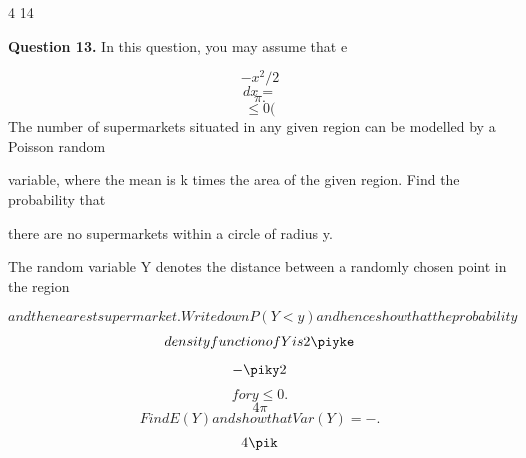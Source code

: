 \documentclass[12pt]{article}
\begin{document}
\begin{flushleft}
4 14\par
\infty\par
\bigskip\textbf{Question 13.} In this question, you may assume that e\par
\[-x^2/2\]
\[dx =\]
\[\pi .\]
\[\leq0 (\]
The number of supermarkets situated in any given region can be modelled by a Poisson random\par
variable, where the mean is k times the area of the given region. Find the probability that\par
there are no supermarkets within a circle of radius y.\par
The random variable Y denotes the distance between a randomly chosen point in the region\par
\[and the nearest supermarket. Write down P(Y < y) and hence show that the probability\]
\[density function of Y is 2\piyke\]
\[-\piky2\]
\[for y \leq 0.\]
\[4 \pi\]
\[Find E(Y ) and show that Var (Y ) = - .\]
\[4\pik\]
\end{flushleft}
\end{document}
